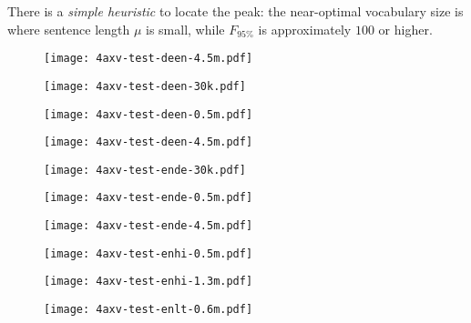  There is a \textit{simple heuristic} to locate the peak: the near-optimal vocabulary size is where sentence length $\mu$ is small, while $F_{95\%}$ is approximately $100$ or higher.

\begin{figure*}[ht]
\begin{subfigure}{\textwidth}
  \centering
  \texttt{[image: 4axv-test-deen-4.5m.pdf]}
\end{subfigure}

\begin{subfigure}{.33\textwidth}
  \centering
  \texttt{[image: 4axv-test-deen-30k.pdf]}
\end{subfigure}
\begin{subfigure}{.32\textwidth}
  \centering
  \texttt{[image: 4axv-test-deen-0.5m.pdf]}
\end{subfigure}
\begin{subfigure}{.33\textwidth}
  \centering
  \texttt{[image: 4axv-test-deen-4.5m.pdf]}
\end{subfigure}

\begin{subfigure}{.33\textwidth}
  \centering
  \texttt{[image: 4axv-test-ende-30k.pdf]}
\end{subfigure}
\begin{subfigure}{.32\textwidth}
  \centering
  \texttt{[image: 4axv-test-ende-0.5m.pdf]}
\end{subfigure}
\begin{subfigure}{.33\textwidth}
  \centering
  \texttt{[image: 4axv-test-ende-4.5m.pdf]}
\end{subfigure}


\begin{subfigure}{.33\textwidth}
  \centering
  \texttt{[image: 4axv-test-enhi-0.5m.pdf]}
\end{subfigure}
\begin{subfigure}{.32\textwidth}
  \centering
  \texttt{[image: 4axv-test-enhi-1.3m.pdf]}
\end{subfigure}
\begin{subfigure}{.33\textwidth}
  \centering
  \texttt{[image: 4axv-test-enlt-0.6m.pdf]}
\end{subfigure}


\end{figure*}
